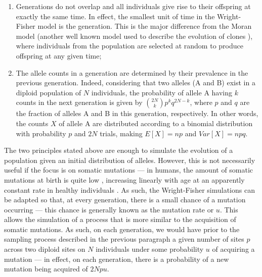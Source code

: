 \begin{enumerate}
	\item Generations do not overlap and all individuals give rise to their offspring at exactly the same time. In effect, the smallest unit of time in the Wright-Fisher model is the generation. This is the major difference from the Moran model (another well known model used to describe the evolution of clones \cite{Beerenwinkel2015-xr}), where individuals from the population are selected at random to produce offspring at any given time;
	\item The allele counts in a generation are determined by their prevalence in the previous generation. Indeed, considering that two alleles (A and B) exist in a diploid population of $N$ individuals, the probability of allele A having $k$ counts in the next generation is given by $\binom{2N}{k}p^kq^{2N-k}$, where $p$ and $q$ are the fraction of alleles A and B in this generation, respectively. In other words, the counts $X$ of allele A are distributed according to a binomial distribution with probability $p$ and $2N$ trials, making $E[X] = np$ and $Var[X] = npq$.
\end{enumerate}

The two principles stated above are enough to simulate the evolution of a population given an initial distribution of alleles. However, this is not necessarily useful if the focus is on somatic mutations --- in humans, the amount of somatic mutations at birth is quite low \cite{SpencerChapman_2021_gjz4x4,Mitchell2021-zl}, increasing linearly with age at an apparently constant rate in healthy individuals \cite{Abascal_2021_gjvqfm,Mitchell2021-zl}. As such, the Wright-Fisher simulations can be adapted so that, at every generation, there is a small chance of a mutation occurring --- this chance is generally known as the mutation rate or $u$. This allows the simulation of a process that is more similar to the acquisition of somatic mutations. As such, on each generation, we would have prior to the sampling process described in the previous paragraph a given number of sites $p$ across two diploid sites on $N$ individuals under some probability $u$ of acquiring a mutation --- in effect, on each generation, there is a probability of a new mutation being acquired of $2Npu$.

